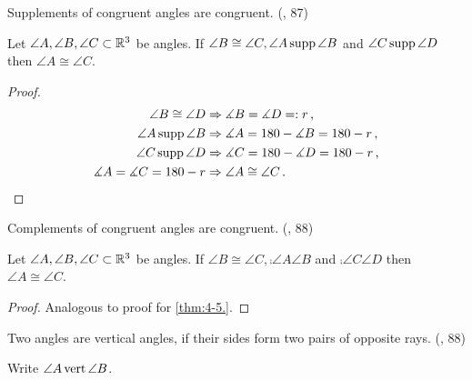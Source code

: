 \begin{theorem}[4-5.]\label{thm:4-5.}
  Supplements of congruent angles are congruent.
  (\cite{SMSGGeometry}, 87)

  Let $\angle A,\angle B, \angle C \subset \mathbb{R}^3$ be angles.
  If $\angle B \cong \angle C, {\angle A}\operatorname{supp}{\angle B}$ and ${\angle C}\operatorname{supp}{\angle D}$ then $\angle A \cong \angle C$.
\end{theorem}

\begin{proof}
  \begin{align*}
    \angle B \cong \angle D &\Rightarrow \measuredangle B=\measuredangle D =:r\, \text{,}\\
    {\angle A}\operatorname{supp}{\angle B}&\Rightarrow \measuredangle A=180-\measuredangle B= 180 -r \, \text{,}\\
    {\angle C}\operatorname{supp}{\angle D} &\Rightarrow \measuredangle C = 180 -\measuredangle D=180-r \, \text{,}\\
    \measuredangle A=\measuredangle C=180-r &\Rightarrow \angle A\cong \angle C\, \text{.}
  \end{align*}
\end{proof}

\begin{theorem}[4-6.]\label{thm:4-6.}
  Complements of congruent angles are congruent.
  (\cite{SMSGGeometry}, 88)

  Let $\angle A,\angle B, \angle C \subset \mathbb{R}^3$ be angles.
  If $\angle B \cong \angle C, \comp{\angle A}{\angle B}$ and $\comp{\angle C}{\angle D}$ then $\angle A \cong \angle C$.
\end{theorem}

\begin{proof}
  Analogous to proof for \ref{thm:4-5.}.
\end{proof}

\begin{definition}\label{def:Vertical_Angles}
  Two angles are vertical angles, if their sides form two pairs of opposite rays.
  (\cite{SMSGGeometry}, 88)

  Write ${\angle A}\operatorname{vert}{\angle B}$.

\end{definition}

